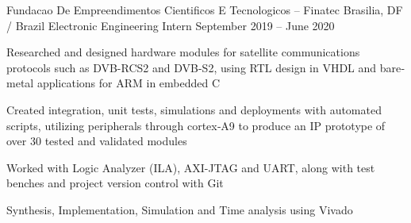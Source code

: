 

\begin{cventries}

  \cventry
    {Fundacao De Empreendimentos Cientificos E Tecnologicos -- Finatec } %
    {Brasilia, DF / Brazil} %
    {Electronic Engineering Intern} %
    {September 2019 -- June 2020} %
    {
      \begin{cvitems} %
            \item Researched and designed hardware modules for satellite communications protocols such as DVB-RCS2 and DVB-S2, using RTL design in VHDL and bare‐metal applications for ARM in embedded C
            \item Created integration, unit tests, simulations and deployments with automated scripts, utilizing peripherals through cortex‑A9 to produce an IP prototype of over 30 tested and validated modules
            \item Worked with Logic Analyzer (ILA), AXI-JTAG and UART, along with test benches and project version control with Git
            \item Synthesis, Implementation, Simulation and Time analysis using Vivado
      \end{cvitems}
    }
\end{cventries}
